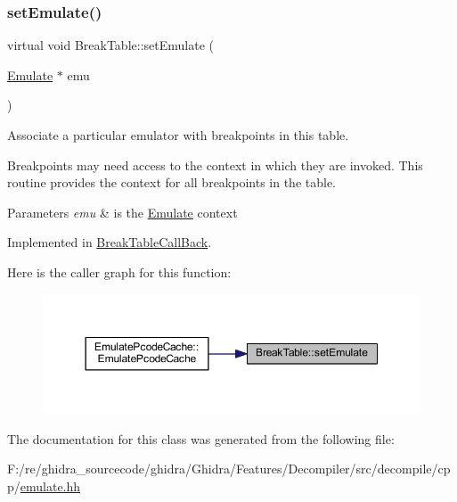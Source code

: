 \subsubsection{\texorpdfstring{setEmulate()}{setEmulate()}}
{\footnotesize\ttfamily virtual void Break\+Table\+::set\+Emulate (\begin{DoxyParamCaption}\item[{\mbox{\hyperlink{class_emulate}{Emulate}} $\ast$}]{emu }\end{DoxyParamCaption})\hspace{0.3cm}{\ttfamily [pure virtual]}}



Associate a particular emulator with breakpoints in this table. 

Breakpoints may need access to the context in which they are invoked. This routine provides the context for all breakpoints in the table. 
\begin{DoxyParams}{Parameters}
{\em emu} & is the \mbox{\hyperlink{class_emulate}{Emulate}} context \\
\hline
\end{DoxyParams}


Implemented in \mbox{\hyperlink{class_break_table_call_back_a341d8841e68c7237e1502e2643016abc}{Break\+Table\+Call\+Back}}.

Here is the caller graph for this function\+:
\nopagebreak
\begin{figure}[H]
\begin{center}
\leavevmode
\includegraphics[width=350pt]{class_break_table_a7efdfc549d576cf17235aa74bbf19a79_icgraph}
\end{center}
\end{figure}


The documentation for this class was generated from the following file\+:\begin{DoxyCompactItemize}
\item 
F\+:/re/ghidra\+\_\+sourcecode/ghidra/\+Ghidra/\+Features/\+Decompiler/src/decompile/cpp/\mbox{\hyperlink{emulate_8hh}{emulate.\+hh}}\end{DoxyCompactItemize}
